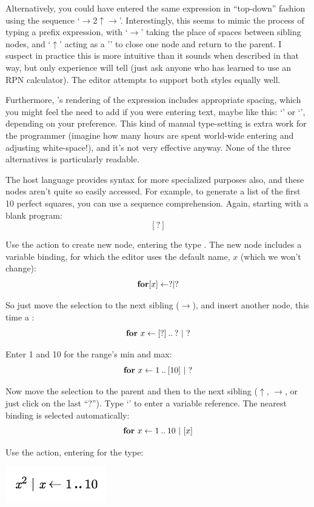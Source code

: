Alternatively, you could have entered the same expression in ``top-down'' fashion using the sequence `$\rightarrow${2}$\uparrow\rightarrow$'. Interestingly, this seems to mimic the process of typing a prefix expression, with `$\rightarrow$' taking the place of spaces between sibling nodes, and `$\uparrow$' acting as a '\clojure{)}' to close one node and return to the parent. I suspect in practice this is more intuitive than it sounds when described in that way, but only experience will tell (just ask anyone who has learned to use an RPN calculator). The editor attempts to support both styles equally well.

Furthermore, \Meta's rendering of the expression includes appropriate spacing, which you might feel the need to add if you were entering text, maybe like this: `' or `', depending on your preference. This kind of manual type-setting is extra work for the programmer (imagine how many hours are spent world-wide entering and adjusting white-space!), and it's not very effective anyway. None of the three alternatives is particularly readable.

\vspace{12pt}

The host language provides syntax for more specialized purposes also, and these nodes aren't quite so easily accessed. For example, to generate a list of the first 10 perfect squares, you can use a sequence comprehension. Again, starting with a blank program:
$$[?]$$

Use the  action to create new node, entering the type . The new node includes a variable binding, for which the editor uses the default name, $x$ (which we won't change):
$$\textbf{for} [x] \leftarrow ? | ?$$

So just move the selection to the next sibling ($\rightarrow$), and insert another node, this time a :
$$\textbf{for} \  x \leftarrow [?] \: .. \: ? \ | \ ?$$

Enter 1 and 10 for the range's min and max:
$$\textbf{for} \  x \leftarrow 1 \: .. \: [10] \ | \ ?$$

Now move the selection to the parent and then to the next sibling ($\uparrow$, $\rightarrow$, or just click on the last ``?''). Type `' to enter a variable reference. The nearest binding is selected automatically:
$$\keyword{for} \  x \leftarrow 1 \: .. \: 10 \ | \ [x]$$

Use the  action, entering  for the type:
\begin{center}
\includegraphics{src/image/for.pdf}
\end{center}

